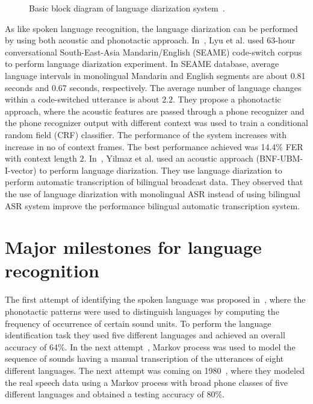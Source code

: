 \begin{spacing}{1.5}
 \begin{figure}[h]
\caption{Basic block diagram of language diarization system~\cite{lyu2013language1}.}
\label{ld}
\end{figure} 
As like spoken language recognition, the language diarization can be performed by using both acoustic and phonotactic approach. In~\cite{lyu2013language}, Lyu et al. used 63-hour conversational South-East-Asia Mandarin/English (SEAME) code-switch corpus to perform language diarization experiment. In SEAME database, average language intervals in monolingual Mandarin and English segments are about 0.81 seconds and 0.67 seconds, respectively. The average number of language changes within a code-switched utterance is about $2.2$. They propose a phonotactic approach, where the acoustic features are passed through a phone recognizer and the phone recognizer output with different context was used to train a conditional random field (CRF) classifier. The performance of the system increases with increase in no of context frames. The best performance achieved was 14.4\% FER with context length $2$. In~\cite{yilmaz2017language}, Yilmaz et al. used an acoustic approach (BNF-UBM-I-vector) to perform language diarization. They use language diarization to perform automatic transcription of bilingual broadcast data. They observed that the use of language diarization with monolingual ASR instead of using bilingual ASR system improve the performance bilingual automatic transcription system. 
\section{Major milestones for language recognition}
The first attempt of identifying the spoken language was proposed in~\cite{leonard1974automatic}, where the phonotactic patterns were used to distinguish languages by computing the frequency of occurrence of certain sound units. To perform the language identification task they used five different languages and achieved an overall accuracy of 64\%. In the next attempt~\cite{house1977toward}, Markov process was used to model the sequence of sounds having a manual transcription of the utterances of eight different languages. The next attempt was coming on 1980~\cite{li1980statistical}, where they modeled the real speech data using a Markov process with broad phone classes of five different languages and obtained a testing accuracy of 80\%. 


\end{spacing}
